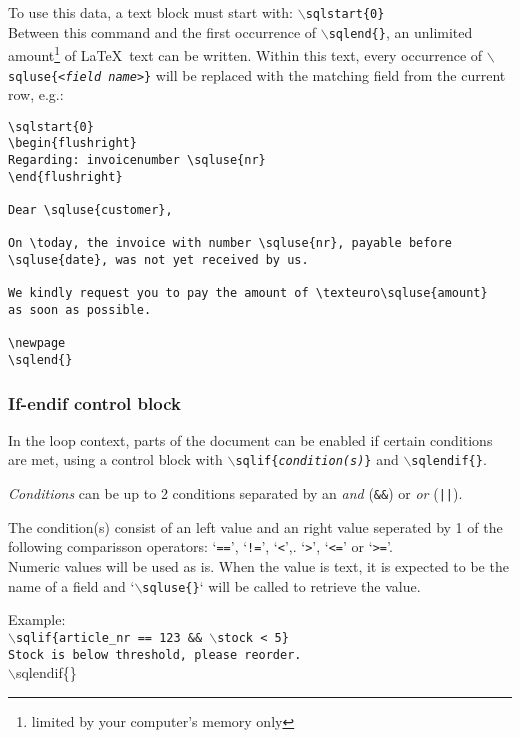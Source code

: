 \documentclass{article}
\newcommand{\bs}{\ensuremath{\backslash}}
\newcommand{\vs}{\vspace{3mm}}
\begin{document}
\vs

To use this data, a text block must start with: \texttt{\bs sqlstart\{0\}}\\
Between this command and the first occurrence of \texttt{\bs sqlend\{\}}, an unlimited amount\footnote{ limited by your computer's memory only} of \LaTeX\ text can be written. Within this text, every occurrence of \texttt{\bs sqluse\{<\textit{field name}>\}} will be replaced with the matching field from the current row, e.g.:

\noindent\begin{verbatim}
\sqlstart{0}
\begin{flushright}
Regarding: invoicenumber \sqluse{nr}
\end{flushright}

Dear \sqluse{customer},

On \today, the invoice with number \sqluse{nr}, payable before
\sqluse{date}, was not yet received by us.

We kindly request you to pay the amount of \texteuro\sqluse{amount}
as soon as possible.

\newpage
\sqlend{}
\end{verbatim}

\subsubsection{If-endif control block}

In the loop context, parts of the document can be enabled if certain conditions are met, using a control block with \texttt{\bs sqlif\{\textit{condition(s)}\}} and \texttt{\bs sqlendif\{\}}.

\vs

\textit{Conditions} can be up to 2 conditions separated by an \textit{and} (\texttt{\&\&}) or \textit{or} (\texttt{||}).

The condition(s) consist of an left value and an right value seperated by 1 of the following comparisson operators: `\texttt{==}', `\texttt{!=}', `\texttt{<}',. `\texttt{>}', `\texttt{<=}' or `\texttt{>=}'.\\
Numeric values will be used as is. When the value is text, it is expected to be the name of a field and `\texttt{\bs sqluse\{\}}` will be called to retrieve the value.
\vs

\noindent Example:\\
\texttt{\bs sqlif\{article\_nr == 123 \&\& \bs stock < 5\}\\
Stock is below threshold, please reorder.
}\\
\bs sqlendif\{\}
\end{document}
